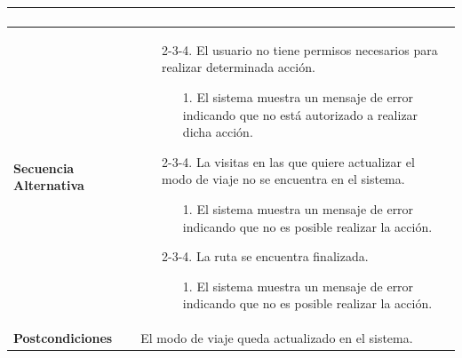 \begin{longtable}{| p{4cm} | p{10cm} |}
\begin{enumerate}[leftmargin=0.7cm, topsep=0.1cm]
\end{enumerate}


\\
\hline
\textbf{Secuencia Alternativa} &\mbox{}\par\vspace{-\baselineskip}

\begin{enumerate}[leftmargin=1.2cm, topsep=0.1cm]
\item[2-3-4.] El usuario no tiene permisos necesarios para realizar determinada acción.
	\begin{itemize}
	\item[1.] El sistema muestra un mensaje de error indicando que no está autorizado a realizar dicha acción.
	\end{itemize}
\item[2-3-4.] La visitas en las que quiere actualizar el modo de viaje no se encuentra en el sistema.
	\begin{itemize}
	\item[1.] El sistema muestra un mensaje de error indicando que no es posible realizar la acción.
	\end{itemize}
\item[2-3-4.] La ruta se encuentra finalizada.
	\begin{itemize}
	\item[1.] El sistema muestra un mensaje de error indicando que no es posible realizar la acción.
	\end{itemize}
\end{enumerate}

\\
\hline
\textbf{Postcondiciones} & 
El modo de viaje queda actualizado en el sistema.\\
\hline
\end{longtable}



\newpage
